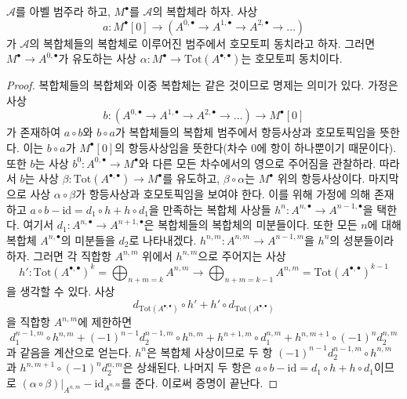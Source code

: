 \begin{lemma}
\label{lemma-homotopy-complex-complexes}
$\mathcal{A}$를 아벨 범주라 하고, $M^\bullet$를 $\mathcal{A}$의
복합체라 하자. 사상
$$
a :
M^\bullet[0]
\longrightarrow
\left(A^{0, \bullet} \to A^{1, \bullet} \to A^{2, \bullet} \to \ldots \right)
$$
가 $\mathcal{A}$의 복합체들의 복합체로 이루어진 범주에서 호모토피
동치라고 하자. 그러면 $M^\bullet \to A^{0, \bullet}$가 유도하는 사상
$\alpha : M^\bullet \to \text{Tot}(A^{\bullet, \bullet})$는 호모토피
동치이다.
\end{lemma}

\begin{proof}
복합체들의 복합체와 이중 복합체는 같은 것이므로 명제는 의미가 있다.
가정은 사상
$$
b :
\left(A^{0, \bullet} \to A^{1, \bullet} \to A^{2, \bullet} \to \ldots \right)
\longrightarrow
M^\bullet[0]
$$
가 존재하여 $a \circ b$와 $b \circ a$가 복합체들의 복합체 범주에서
항등사상과 호모토픽임을 뜻한다. 이는 $b \circ a$가 $M^\bullet[0]$의
항등사상임을 뜻한다(차수 $0$에 항이 하나뿐이기 때문이다). 또한 $b$는
사상 $b^0 : A^{0, \bullet} \to M^\bullet$와 다른 모든 차수에서의 영으로
주어짐을 관찰하라. 따라서 $b$는 사상
$\beta : \text{Tot}(A^{\bullet, \bullet}) \to M^\bullet$를 유도하고,
$\beta \circ \alpha$는 $M^\bullet$ 위의 항등사상이다.
마지막으로 사상 $\alpha \circ \beta$가 항등사상과 호모토픽임을 보여야
한다. 이를 위해 가정에 의해 존재하고
$a \circ b - \text{id} = d_1 \circ h + h \circ d_1$을 만족하는 복합체
사상들 $h^n : A^{n, \bullet} \to A^{n - 1, \bullet}$을 택한다. 여기서
$d_1 : A^{n, \bullet} \to A^{n + 1, \bullet}$은 복합체들의 복합체의
미분들이다. 또한 모든 $n$에 대해 복합체 $A^{n, \bullet}$의 미분들을
$d_2$로 나타내겠다.
$h^{n, m} : A^{n, m} \to A^{n - 1, m}$을 $h^n$의 성분들이라 하자.
그러면 각 직합항 $A^{n, m}$ 위에서 $h^{n, m}$으로 주어지는 사상
$$
h' : \text{Tot}(A^{\bullet, \bullet})^k =
\bigoplus\nolimits_{n + m = k} A^{n, m}
\to
\bigoplus\nolimits_{n + m = k - 1} A^{n, m} =
\text{Tot}(A^{\bullet, \bullet})^{k - 1}
$$
을 생각할 수 있다. 사상
$$
d_{\text{Tot}(A^{\bullet, \bullet})} \circ h' +
h' \circ d_{\text{Tot}(A^{\bullet, \bullet})}
$$
을 직합항 $A^{n, m}$에 제한하면
$$
d_1^{n - 1, m} \circ h^{n, m} +
(-1)^{n - 1} d_2^{n - 1, m} \circ h^{n, m} +
h^{n + 1, m} \circ d_1^{n, m} + h^{n, m + 1} \circ (-1)^nd_2^{n, m}
$$
과 같음을 계산으로 얻는다. $h^n$은 복합체 사상이므로 두 항
$(-1)^{n - 1} d_2^{n - 1, m} \circ h^{n, m}$과
$h^{n, m + 1} \circ (-1)^nd_2^{n, m}$은 상쇄된다. 나머지 두 항은
$a \circ b - \text{id} = d_1 \circ h + h \circ d_1$이므로
$(\alpha \circ \beta)|_{A^{n, m}} - \text{id}_{A^{n, m}}$를 준다.
이로써 증명이 끝난다.
\end{proof}

